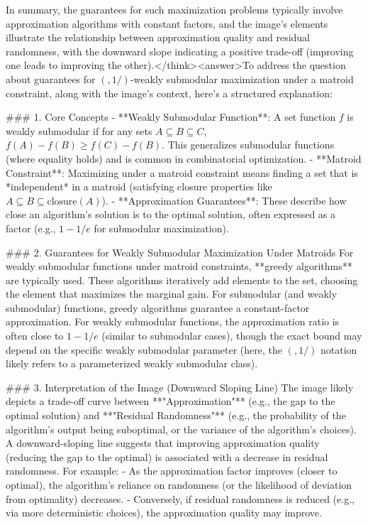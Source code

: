 In summary, the guarantees for such maximization problems typically involve approximation algorithms with constant factors, and the image's elements illustrate the relationship between approximation quality and residual randomness, with the downward slope indicating a positive trade-off (improving one leads to improving the other).</think><answer>To address the question about guarantees for \((,1/)\)-weakly submodular maximization under a matroid constraint, along with the image's context, here's a structured explanation:  


### 1. Core Concepts  
- **Weakly Submodular Function**: A set function \( f \) is weakly submodular if for any sets \( A \subseteq B \subseteq C \), \( f(A) - f(B) \geq f(C) - f(B) \). This generalizes submodular functions (where equality holds) and is common in combinatorial optimization.  
- **Matroid Constraint**: Maximizing under a matroid constraint means finding a set that is *independent* in a matroid (satisfying closure properties like \( A \subseteq B \subseteq \text{closure}(A) \)).  
- **Approximation Guarantees**: These describe how close an algorithm’s solution is to the optimal solution, often expressed as a factor (e.g., \( 1 - 1/e \) for submodular maximization).  


### 2. Guarantees for Weakly Submodular Maximization Under Matroids  
For weakly submodular functions under matroid constraints, **greedy algorithms** are typically used. These algorithms iteratively add elements to the set, choosing the element that maximizes the marginal gain. For submodular (and weakly submodular) functions, greedy algorithms guarantee a constant-factor approximation. For weakly submodular functions, the approximation ratio is often close to \( 1 - 1/e \) (similar to submodular cases), though the exact bound may depend on the specific weakly submodular parameter (here, the \((,1/)\) notation likely refers to a parameterized weakly submodular class).  


### 3. Interpretation of the Image (Downward Sloping Line)  
The image likely depicts a trade-off curve between **"Approximation"** (e.g., the gap to the optimal solution) and **"Residual Randomness"** (e.g., the probability of the algorithm’s output being suboptimal, or the variance of the algorithm’s choices). A downward-sloping line suggests that improving approximation quality (reducing the gap to the optimal) is associated with a decrease in residual randomness. For example:  
- As the approximation factor improves (closer to optimal), the algorithm’s reliance on randomness (or the likelihood of deviation from optimality) decreases.  
- Conversely, if residual randomness is reduced (e.g., via more deterministic choices), the approximation quality may improve.  


